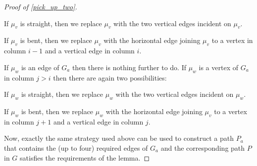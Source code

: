 \documentclass{patmorin}
\begin{document}
\begin{proof}[Proof of \cref{pick_up_two}]
\begin{compactenum}
    \begin{compactitem}
      \item If $\mu_v$ is straight, then we replace $\mu_v$ with the two vertical edges incident on $\mu_v$.
      \item If $\mu_v$ is bent, then we replace $\mu_v$ with the horizontal edge joining $\mu_v$ to a vertex in column $i-1$ and a vertical edge in column $i$.
    \end{compactitem}
    If $\mu_w$ is an edge of $G_a$ then there is nothing further to do. If $\mu_w$ is a vertex of $G_a$ in column $j>i$ then there are again two possibilities:
    \begin{compactitem}
      \item If $\mu_w$ is straight, then we replace $\mu_w$ with the two vertical edges incident on $\mu_w$.
      \item If $\mu_w$ is bent, then we replace $\mu_w$ with the horizontal edge joining $\mu_v$ to a vertex in column $j+1$ and a vertical edge in column $j$.
    \end{compactitem}
  \end{compactenum}
  Now, exactly the same strategy used above can be used to construct a path $P_a$ that contains the (up to four) required edges of $G_a$ and the corresponding path $P$ in $G$ satisfies the requirements of the lemma.
\end{proof}
\end{document}

